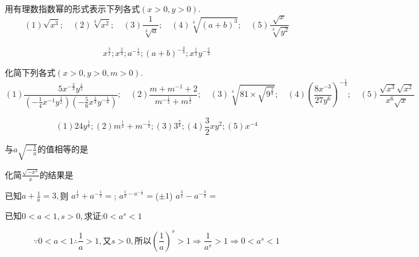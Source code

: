 \begin{problem}
    用有理数指数幂的形式表示下列各式$(x>0,y>0)$.
    $$(1)\sqrt{x^3};\quad (2)\sqrt[3]{x^2};\quad(3)\frac{1}{\sqrt[3]{a}}; \quad (4)\sqrt[4]{(a+b)^3}; \quad (5)\frac{\sqrt{x}}{\sqrt[3]{y^2}} $$
    \begin{jiexi}
        $$x^{\frac{3}{2}};x^{\frac{2}{3}};a^{-\frac{1}{3}};(a+b)^{-\frac{3}{4}};x^{\frac{1}{2}}y^{-\frac{2}{3}}$$
    \end{jiexi}
\end{problem}

\begin{problem}
    化简下列各式$(x>0,y>0,m>0)$.
    $$(1)\frac{5x^{-\frac{2}{3}}y^{\frac{1}{2}}}{(-\frac{1}{4}x^{-1}y^{\frac{1}{2}})(-\frac{5}{6}x^{\frac{1}{3}}y^{-\frac{1}{6}})};\quad 
    (2)\frac{m+m^{-1}+2}{m^{-\frac{1}{2}}+m^{\frac{1}{2}}};\quad
    (3)\sqrt[4]{81\times\sqrt{9^{\frac{2}{3}}}}; \quad 
    (4)(\frac{8x^{-3}}{27y^6})^{-\frac{1}{3}}; \quad 
    (5)\frac{\sqrt{x^3}\sqrt{x^2}}{x^6\sqrt{x}} $$
    \begin{jiexi}
        $$(1)24y^{\frac{1}{6}};(2)m^{\frac{1}{2}}+m^{-\frac{1}{2}};(3)3^{\frac{7}{6}};
        (4)\frac{3}{2}xy^2;(5)x^{-4}$$
    \end{jiexi}
\end{problem}

\begin{problem}
    与$\displaystyle a\sqrt{-\frac{1}{a}}$的值相等的是\\
\end{problem}

\begin{problem}
    化简$\displaystyle \frac{\sqrt{-x^3}}{x}$的结果是\\
\end{problem}

\begin{problem}
    已知$\displaystyle a+\frac{1}{a}=3,$则
    $\displaystyle a^{\frac{1}{2}}+a^{-\frac{1}{2}}=$;
    $\displaystyle a^{\frac{1}{2}-a^{-\frac{1}{2}}}=$\tiankong($\pm 1$)
    $\displaystyle a^{\frac{3}{2}}-a^{-\frac{3}{2}}=$\\
\end{problem}

\begin{problem}
    已知$\displaystyle 0<a<1,s>0,$求证:$0<a^s<1$
    \begin{jiexi}
        $$\because 0<a<1 \therefore \frac{1}{a}>1,\text{又}s>0,\text{所以}(\frac{1}{a})^s>1 
        \Rightarrow \frac{1}{a^s}>1 \Rightarrow 0<a^s<1$$
    \end{jiexi}
\end{problem}

